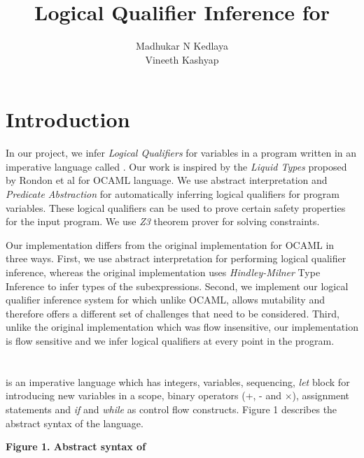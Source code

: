 \documentclass[9pt]{article}
\title{\textbf{Logical Qualifier Inference for \lang}}
\author{Madhukar N Kedlaya\\
		Vineeth Kashyap}
\date{}
\begin{document}
\maketitle

\section{Introduction}

In our project, we infer \textit{Logical Qualifiers} for variables in a program written in an imperative language called \lang. Our work is inspired by the \textit{Liquid Types} proposed by Rondon et al\cite{Rondon2008} for OCAML language. We use abstract interpretation and \textit{Predicate Abstraction} for automatically inferring logical qualifiers for program variables. These logical qualifiers can be used to prove certain safety properties for the input program. We use \textit{Z3} theorem prover\cite{Z3} for solving constraints.

Our implementation differs from the original implementation for OCAML in three ways. First, we use abstract interpretation for performing logical qualifier inference, whereas the original implementation uses \textit{Hindley-Milner} Type Inference to infer types of the subexpressions. Second, we implement our logical qualifier inference system for \lang which unlike OCAML, \lang allows mutability and therefore offers a different set of challenges that need to be considered. Third, unlike the original implementation which was flow insensitive, our implementation is flow sensitive and we infer logical qualifiers at every point in the program.

\section{\lang}

\lang is an imperative language which has integers, variables, sequencing, \textit{let} block for introducing new variables in a scope, binary operators (+, - and \ensuremath{\times}), assignment statements and \textit{if} and \textit{while} as control flow constructs. Figure 1 describes the abstract syntax of the language.\\
\begin{center}\textbf{Figure 1. Abstract syntax of \lang}\end{center}
\end{document}

